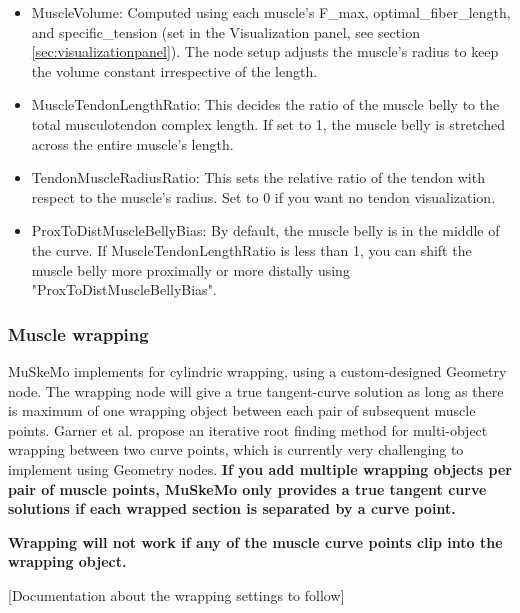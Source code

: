 \documentclass{article}
\begin{document}
\begin{itemize}
\item{MuscleVolume:} Computed using each muscle's F\_max, optimal\_fiber\_length, and specific\_tension (set in the Visualization panel, see section \ref{sec:visualizationpanel}). The node setup adjusts the muscle's radius to keep the volume constant irrespective of the length.
\item{MuscleTendonLengthRatio: } This decides the ratio of the muscle belly to the total musculotendon complex length. If set to 1, the muscle belly is stretched across the entire muscle's length. 
\item{TendonMuscleRadiusRatio: } This sets the relative ratio of the tendon with respect to the muscle's radius. Set to 0 if you want no tendon visualization.
\item{ProxToDistMuscleBellyBias: } By default, the muscle belly is in the middle of the curve. If MuscleTendonLengthRatio is less than 1, you can shift the muscle belly more proximally or more distally using "ProxToDistMuscleBellyBias".
\end{itemize}


\subsubsection{Muscle wrapping}
\label{sec:musclewrapping}

MuSkeMo implements \cite{garnerObstacleSetMethodRepresenting2000} for cylindric wrapping, using a custom-designed Geometry node. The wrapping node will give a true tangent-curve solution as long as there is maximum of one wrapping object between each pair of subsequent muscle points. Garner et al. \cite{garnerObstacleSetMethodRepresenting2000} propose an iterative root finding method for multi-object wrapping between two curve points, which is currently very challenging to implement using Geometry nodes. \textbf{If you add multiple wrapping objects per pair of muscle points, MuSkeMo only provides a true tangent curve solutions if each wrapped section is separated by a curve point.} 

\textbf{Wrapping will not work if any of the muscle curve points clip into the wrapping object.}

[Documentation about the wrapping settings to follow]

\end{document}
